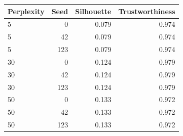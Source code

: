 \begin{tabular}{lrrr}
\toprule
Perplexity & Seed & Silhouette & Trustworthiness \\
\midrule
5 & 0 & 0.079 & 0.974 \\
5 & 42 & 0.079 & 0.974 \\
5 & 123 & 0.079 & 0.974 \\
30 & 0 & 0.124 & 0.979 \\
30 & 42 & 0.124 & 0.979 \\
30 & 123 & 0.124 & 0.979 \\
50 & 0 & 0.133 & 0.972 \\
50 & 42 & 0.133 & 0.972 \\
50 & 123 & 0.133 & 0.972 \\
\bottomrule
\end{tabular}
